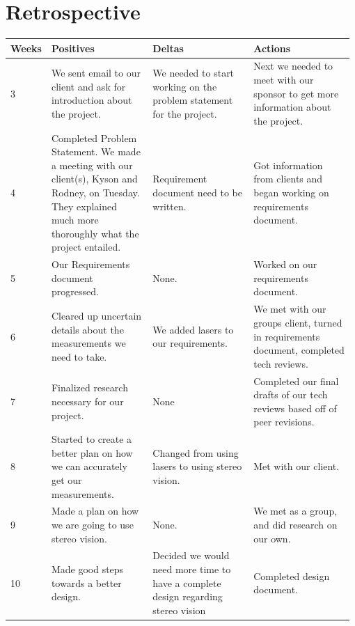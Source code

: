 \documentclass[onecolumn, draftclsnofoot,10pt, compsoc]{IEEEtran}
\begin{document}
\section{Retrospective}
\begin{longtable}{ | p{0.075\linewidth} | p{0.3\linewidth} | p{0.3\linewidth} | p{0.3\linewidth} |} \hline
Weeks & Positives & Deltas & Actions  \\ \hline
3 & We sent email to our client and ask for introduction about the project. & We needed to start working on the problem statement for the project. & Next we needed to meet with our sponsor to get more information about the project. \\ \hline
4 & Completed Problem Statement. We made a meeting with our client(s), Kyson and Rodney, on Tuesday. They explained much more thoroughly what the project entailed. & Requirement document need to be written. & Got information from clients and began working on requirements document. \\ \hline
5 & Our Requirements document progressed. & None. & Worked on our requirements document. \\ \hline
6 & Cleared up uncertain details about the measurements we need to take. & We added lasers to our requirements. & We met with our groups client, turned in requirements document, completed tech reviews. \\ \hline
7 & Finalized research necessary for our project. & None & Completed our final drafts of our tech reviews based off of peer revisions. \\ \hline
8 & Started to create a better plan on how we can accurately get our measurements. & Changed from using lasers to using stereo vision.  & Met with our client. \\ \hline
9 & Made a plan on how we are going to use stereo vision. & None. & We met as a group, and did research on our own. \\ \hline
10 & Made good steps towards a better design. & Decided we would need more time to have a complete design regarding stereo vision & Completed design document. \\ \hline
\end{longtable}
\end{document}
